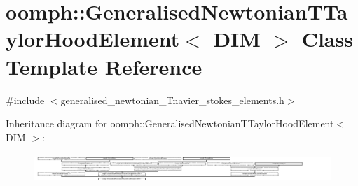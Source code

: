 \hypertarget{classoomph_1_1GeneralisedNewtonianTTaylorHoodElement}{}\section{oomph\+:\+:Generalised\+Newtonian\+T\+Taylor\+Hood\+Element$<$ D\+IM $>$ Class Template Reference}
\label{classoomph_1_1GeneralisedNewtonianTTaylorHoodElement}


{\ttfamily \#include $<$generalised\+\_\+newtonian\+\_\+\+Tnavier\+\_\+stokes\+\_\+elements.\+h$>$}

Inheritance diagram for oomph\+:\+:Generalised\+Newtonian\+T\+Taylor\+Hood\+Element$<$ D\+IM $>$\+:\begin{figure}[H]
\begin{center}
\leavevmode
\includegraphics[height=1.100629cm]{classoomph_1_1GeneralisedNewtonianTTaylorHoodElement}
\end{center}
\end{figure}

